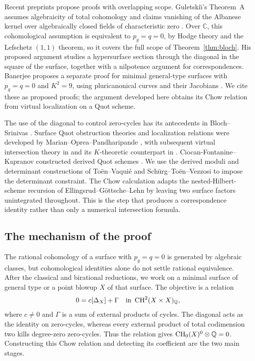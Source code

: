 Recent preprints propose proofs with overlapping scope.
Guletski\u\i's Theorem~A assumes algebraicity of total cohomology
and claims vanishing of the Albanese kernel over algebraically closed
fields of characteristic zero \cite[Theorem~A and Section~2.1]{Guletskii}.
Over $\mathbb C$, this cohomological assumption is equivalent to
$p_g=q=0$, by Hodge theory and the Lefschetz $(1,1)$ theorem, so it
covers the full scope of Theorem~\ref{thm:bloch}. His proposed argument studies a hypersurface section through the
diagonal in the square of the surface, together with a nilpotence
argument for correspondences.
Banerjee proposes a separate proof for minimal general-type surfaces
with $p_g=q=0$ and $K^2=9$, using pluricanonical curves and their
Jacobians \cite[Theorems~1.1 and~2.1]{BanerjeeRankOne}.
We cite these as proposed proofs; the argument developed here obtains
its Chow relation from virtual localization on a Quot scheme.

The use of the diagonal to control zero-cycles has its antecedents in
Bloch--Srinivas \cite{BlochSrinivas}. Surface Quot obstruction theories
and localization relations were developed by Marian--Oprea--Pandharipande
\cite{MOP}, with subsequent virtual intersection theory in \cite{OP}
and its $K$-theoretic counterpart in \cite{AJLOP}.
Ciocan-Fontanine--Kapranov constructed derived Quot schemes \cite{CFK}.
We use the derived moduli and determinant constructions of
To\"en--Vaqui\'e and Sch\"urg--To\"en--Vezzosi \cite{TV,STV}
to impose the determinant constraint. The Chow calculation adapts the
nested-Hilbert-scheme recursion of Ellingsrud--G\"ottsche--Lehn
\cite{EGL} by leaving two surface factors unintegrated throughout.
This is the step that produces a correspondence identity rather than
only a numerical intersection formula.

\subsection*{The mechanism of the proof}

The rational cohomology of a surface with $p_g=q=0$ is generated by algebraic
classes, but cohomological identities alone do not settle rational
equivalence. After the classical and birational reductions, we work on
a minimal surface of general type or a point blowup $X$ of that surface.
The objective is a relation
\begin{equation}\label{eq:intro-diagonal}
 0=c[\Delta_X]+\Gamma\quad\text{in }\operatorname{CH}^2(X\times X)_{\mathbb Q},
\end{equation}
where $c\ne0$ and $\Gamma$ is a sum of external products of cycles.
The diagonal acts as the identity on zero-cycles, whereas every external
product of total codimension two kills degree-zero zero-cycles.
Thus the relation gives $\operatorname{CH}_0(X)^0\otimes\mathbb Q=0$.
Constructing this Chow relation and detecting its coefficient are the
two main stages.

